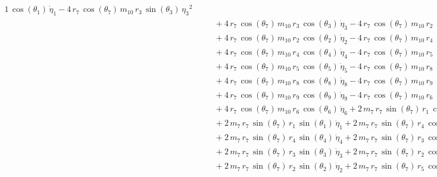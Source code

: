 \begin{eqnarray*}
{1}\,\cos({\theta_{1}})\,{\dot{\eta}_{1}} - 4\,r_{7}\,\cos({\theta_{7}}
)\,m_{10}\,r_{3}\,\sin({\theta_{3}})\,{{\eta_{3}}}^2 \\ &&\quad\mbox{}
 + 4\,r_{7}\,\cos({\theta_{7}})\,m_{10}\,r_{3}\,\cos({\theta_{3}})\,{
\dot{\eta}_{3}} - 4\,r_{7}\,\cos({\theta_{7}})\,m_{10}\,r_{2}\,\sin({
\theta_{2}})\,{{\eta_{2}}}^2 \\ &&\quad\mbox{} + 4\,r_{7}\,\cos({
\theta_{7}})\,m_{10}\,r_{2}\,\cos({\theta_{2}})\,{\dot{\eta}_{2}} - 4
\,r_{7}\,\cos({\theta_{7}})\,m_{10}\,r_{4}\,\sin({\theta_{4}})\,{{\eta
_{4}}}^2 \\ &&\quad\mbox{} + 4\,r_{7}\,\cos({\theta_{7}})\,m_{10}\,r_{
4}\,\cos({\theta_{4}})\,{\dot{\eta}_{4}} - 4\,r_{7}\,\cos({\theta_{7}}
)\,m_{10}\,r_{5}\,\sin({\theta_{5}})\,{{\eta_{5}}}^2 \\ &&\quad\mbox{}
 + 4\,r_{7}\,\cos({\theta_{7}})\,m_{10}\,r_{5}\,\cos({\theta_{5}})\,{
\dot{\eta}_{5}} - 4\,r_{7}\,\cos({\theta_{7}})\,m_{10}\,r_{8}\,\sin({
\theta_{8}})\,{{\eta_{8}}}^2 \\ &&\quad\mbox{} + 4\,r_{7}\,\cos({
\theta_{7}})\,m_{10}\,r_{8}\,\cos({\theta_{8}})\,{\dot{\eta}_{8}} - 4
\,r_{7}\,\cos({\theta_{7}})\,m_{10}\,r_{9}\,\sin({\theta_{9}})\,{{\eta
_{9}}}^2 \\ &&\quad\mbox{} + 4\,r_{7}\,\cos({\theta_{7}})\,m_{10}\,r_{
9}\,\cos({\theta_{9}})\,{\dot{\eta}_{9}} - 4\,r_{7}\,\cos({\theta_{7}}
)\,m_{10}\,r_{6}\,\sin({\theta_{6}})\,{{\eta_{6}}}^2 \\ &&\quad\mbox{}
 + 4\,r_{7}\,\cos({\theta_{7}})\,m_{10}\,r_{6}\,\cos({\theta_{6}})\,{
\dot{\eta}_{6}} + 2\,m_{7}\,r_{7}\,\sin({\theta_{7}})\,r_{1}\,\cos({
\theta_{1}})\,{{\eta_{1}}}^2 \\ &&\quad\mbox{} + 2\,m_{7}\,r_{7}\,\sin
({\theta_{7}})\,r_{1}\,\sin({\theta_{1}})\,{\dot{\eta}_{1}} + 2\,m_{7}
\,r_{7}\,\sin({\theta_{7}})\,r_{4}\,\cos({\theta_{4}})\,{{\eta_{4}}}^2
 \\ &&\quad\mbox{} + 2\,m_{7}\,r_{7}\,\sin({\theta_{7}})\,r_{4}\,\sin(
{\theta_{4}})\,{\dot{\eta}_{4}} + 2\,m_{7}\,r_{7}\,\sin({\theta_{7}})
\,r_{3}\,\cos({\theta_{3}})\,{{\eta_{3}}}^2 \\ &&\quad\mbox{} + 2\,m_{
7}\,r_{7}\,\sin({\theta_{7}})\,r_{3}\,\sin({\theta_{3}})\,{\dot{\eta}
_{3}} + 2\,m_{7}\,r_{7}\,\sin({\theta_{7}})\,r_{2}\,\cos({\theta_{2}})
\,{{\eta_{2}}}^2 \\ &&\quad\mbox{} + 2\,m_{7}\,r_{7}\,\sin({\theta_{7}
})\,r_{2}\,\sin({\theta_{2}})\,{\dot{\eta}_{2}} + 2\,m_{7}\,r_{7}\,
\sin({\theta_{7}})\,r_{5}\,\cos({\theta_{5}})\,{{\eta_{5}}}^2

\end{eqnarray*}
